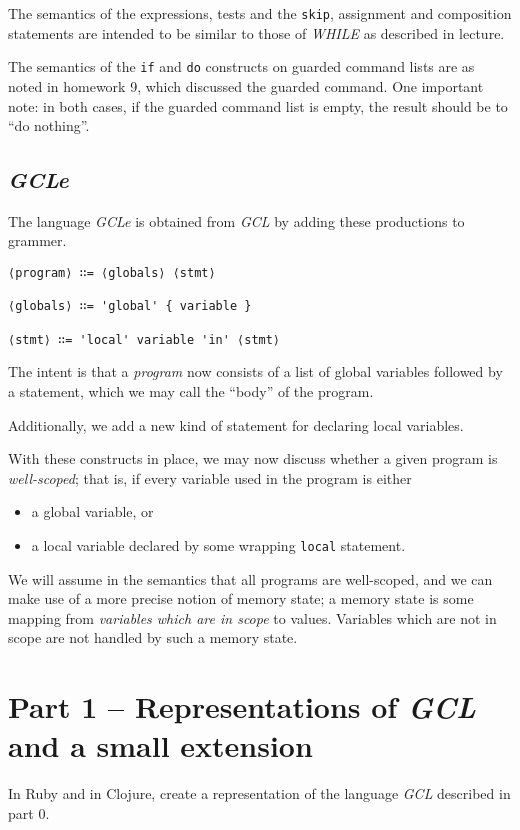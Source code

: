 \documentclass[11pt]{article}
\theoremstyle{definition}
\begin{document}
The semantics of the expressions, tests and
the \texttt{skip}, assignment and composition statements
are intended to be similar to those of \emph{WHILE} as described in lecture.

The semantics of the \texttt{if} and \texttt{do} constructs on guarded command lists
are as noted in homework 9, which discussed the guarded command.
One important note: in both cases, if the guarded command list
is empty, the result should be to “do nothing”.

\subsection*{\emph{GCLe}}
\label{sec:org4ec9d90}
The language \emph{GCLe} is obtained from \emph{GCL} by adding these productions
to grammer.
\begin{verbatim}
⟨program⟩ ∷= ⟨globals⟩ ⟨stmt⟩

⟨globals⟩ ∷= 'global' { variable }

⟨stmt⟩ ∷= 'local' variable 'in' ⟨stmt⟩
\end{verbatim}

The intent is that a \emph{program} now consists of
a list of global variables followed by a statement,
which we may call the “body” of the program.

Additionally, we add a new kind of statement for declaring
local variables.

With these constructs in place, we may now discuss
whether a given program is \emph{well-scoped};
that is, if every variable used in the program is either
\begin{itemize}
\item a global variable, or
\item a local variable declared by some wrapping \texttt{local} statement.
\end{itemize}

We will assume in the semantics that all programs are well-scoped,
and we can make use of a more precise notion of memory state;
a memory state is some mapping from \emph{variables which are in scope} to
values. Variables which are not in scope are not handled
by such a memory state.

\section*{Part 1 – Representations of \emph{GCL} and a small extension}
\label{sec:orgac49491}
In Ruby and in Clojure, create a representation of
the language \emph{GCL} described in part 0.
\end{document}

